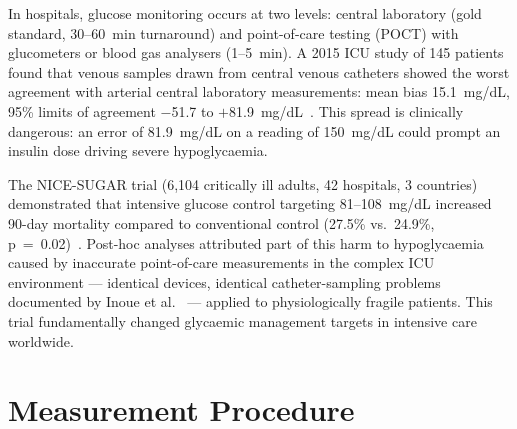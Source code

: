 In hospitals, glucose monitoring occurs at two levels: central laboratory (gold standard, 30--60~min turnaround) and point-of-care testing (POCT) with glucometers or blood gas analysers (1--5~min). A 2015 ICU study of 145 patients found that venous samples drawn from central venous catheters showed the worst agreement with arterial central laboratory measurements: mean bias 15.1~mg/dL, 95\% limits of agreement $-$51.7 to $+$81.9~mg/dL~\cite{inaccuracy2015}. This spread is clinically dangerous: an error of 81.9~mg/dL on a reading of 150~mg/dL could prompt an insulin dose driving severe hypoglycaemia.

The NICE-SUGAR trial (6,104 critically ill adults, 42 hospitals, 3 countries) demonstrated that intensive glucose control targeting 81--108~mg/dL increased 90-day mortality compared to conventional control (27.5\% vs.\ 24.9\%, p~=~0.02)~\cite{nicesugar2009}. Post-hoc analyses attributed part of this harm to hypoglycaemia caused by inaccurate point-of-care measurements in the complex ICU environment --- identical devices, identical catheter-sampling problems documented by Inoue et al.~\cite{inaccuracy2015} --- applied to physiologically fragile patients. This trial fundamentally changed glycaemic management targets in intensive care worldwide.

\section{Measurement Procedure}

